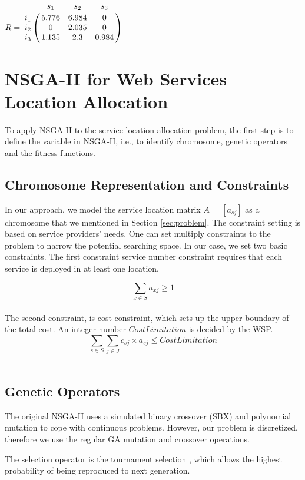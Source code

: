 \documentclass{llncs}
\let\bbordermatrix\bordermatrix
\begin{document}
{\centering
$
R = \bbordermatrix{~ & s_{1} & s_{2} & s_{3}\cr
					i_{1}	&5.776 &6.984 &0	\cr
					i_{2}	&0  &2.035 &0	\cr
					i_{3}	&1.135 &2.3 &0.984	\cr}
$
\\}

\section{NSGA-II for Web Services Location Allocation}
\label{sec:algorithm_des}
To apply NSGA-II to the service location-allocation problem, the first step is to define the variable in NSGA-II, i.e., to
identify chromosome, genetic operators and the fitness functions.

\subsection{Chromosome Representation and Constraints}
In our approach, we model the service location matrix $A$ = $[a_{sj}]$ as a chromosome that we mentioned in Section 
\ref{sec:problem}. The constraint setting is based on service providers' needs. One can set multiply constraints to the problem to narrow the potential searching space.
In our case, we set two basic constraints. The first constraint service number constraint requires that each service is deployed in at 
least one location.

{
	\centering
	\begin{equation}
		\sum\limits_{x \in S} a_{xj} \geq 1
	\end{equation}
\\}
The second constraint, is cost constraint, which sets up  the upper boundary of the total cost.
An integer number $CostLimitation$ is decided by the WSP.
{
	\centering
	\begin{equation}
		\sum\limits_{s \in S} \sum\limits_{j \in J} c_{sj} \times a_{sj} \leq CostLimitation
	\end{equation}
\\}
\subsection{Genetic Operators}
\label{sec:operators}
 The original NSGA-II uses a simulated 
binary crossover (SBX) \cite{930314} and polynomial mutation \cite{Raghuwanshi04} 
to cope with continuous problems. 
However, our problem is discretized, therefore we use the regular GA mutation and crossover operations.

The selection operator is the tournament selection \cite{Xie:2008:AMI:1389095.1389347}, which allows the highest probability 
of being reproduced to next generation.
\end{document}
